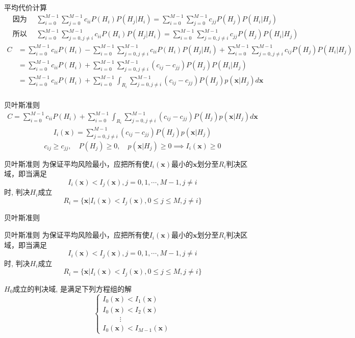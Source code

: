 \begin{frame}[shrink]{平均代价计算}
\begin{align*}
&\text{因为 }\quad \sum_{i=0}^{M-1}\sum_{j=0}^{M-1}c_{ii}P(H_i)P(H_j|H_i)=\sum_{i=0}^{M-1}\sum_{j=0}^{M-1}c_{jj}P(H_j)P(H_i|H_j)\\
&\text{所以 }\quad \sum_{i=0}^{M-1}\sum_{j=0,j\ne i}^{M-1}c_{ii}P(H_i)P(H_j|H_i)=\sum_{i=0}^{M-1}\sum_{j=0,j\ne i}^{M-1}c_{jj}P(H_j)P(H_i|H_j)
\end{align*}
\begin{align*}
C&=\sum_{i=0}^{M-1}c_{ii}P(H_i)-\sum_{i=0}^{M-1}\sum_{j=0,j\ne i}^{M-1}c_{ii}P(H_i)P(H_j|H_i)+\sum_{i=0}^{M-1}\sum_{j=0,j\ne i}^{M-1}c_{ij}P(H_j)P(H_i|H_j)\\
&=\sum_{i=0}^{M-1}c_{ii}P(H_i)+\sum_{i=0}^{M-1}\sum_{j=0,j\ne i}^{M-1}\left(c_{ij}-c_{jj}\right)P(H_j)P(H_i|H_j)\\
&=\sum_{i=0}^{M-1}c_{ii}P(H_i)+\sum_{i=0}^{M-1}\int_{R_i}\sum_{j=0,j\ne i}^{M-1}\left(c_{ij}-c_{jj}\right)P(H_j)p(\bm{x}|H_j)d\bm{x}\\
\end{align*}
\end{frame}

\begin{frame}[shrink]{贝叶斯准则}
\begin{align*}
C=\sum_{i=0}^{M-1}c_{ii}P(H_i)+\sum_{i=0}^{M-1}\int_{R_i}\sum_{j=0,j\ne i}^{M-1}\left(c_{ij}-c_{jj}\right)P(H_j)p(\bm{x}|H_j)d\bm{x}
\end{align*}
\begin{align*}
I_{i}(\bm{x})=\sum_{j=0,j\ne i}^{M-1}\left(c_{ij}-c_{jj}\right)P(H_j)p(\bm{x}|H_j)
\end{align*}
\[c_{ij}\ge c_{jj},\quad P(H_j)\ge 0,\quad p(\bm{x}|H_j)\ge 0\implies I_{i}(\bm{x})\ge 0 \]
\begin{block}{贝叶斯准则}
	为保证平均风险最小，应把所有使$I_{i}(\bm{x})$最小的$\bm{x}$划分至$R_i$判决区域，即当满足
	\[I_{i}(\bm{x})<I_j(\bm{x}), j=0,1,\cdots,M-1, j\ne i \]
	时, 判决$H_i$成立
	\[R_i=\{\bm{x}|I_i(\bm{x})<I_j(\bm{x}), 0\le j\le M, j\ne i\} \]
\end{block}
\end{frame}

\begin{frame}[shrink]{贝叶斯准则}
\begin{block}{贝叶斯准则}
	为保证平均风险最小，应把所有使$I_{i}(\bm{x})$最小的$\bm{x}$划分至$R_i$判决区域，即当满足
	\[I_{i}(\bm{x})<I_j(\bm{x}), j=0,1,\cdots,M-1, j\ne i \]
	时, 判决$H_i$成立
	\[R_i=\{\bm{x}|I_i(\bm{x})<I_j(\bm{x}), 0\le j\le M, j\ne i\} \]
\end{block}
\begin{block}{$H_0$成立的判决域, 是满足下列方程组的解}
	\[
	\begin{cases}
	I_0(\bm{x})< I_1(\bm{x})\\
	I_0(\bm{x})< I_2(\bm{x})\\
	\hspace{1cm} \vdots\\
	I_0(\bm{x})< I_{M-1}(\bm{x})
	\end{cases}
	\]
\end{block}
\end{frame}

